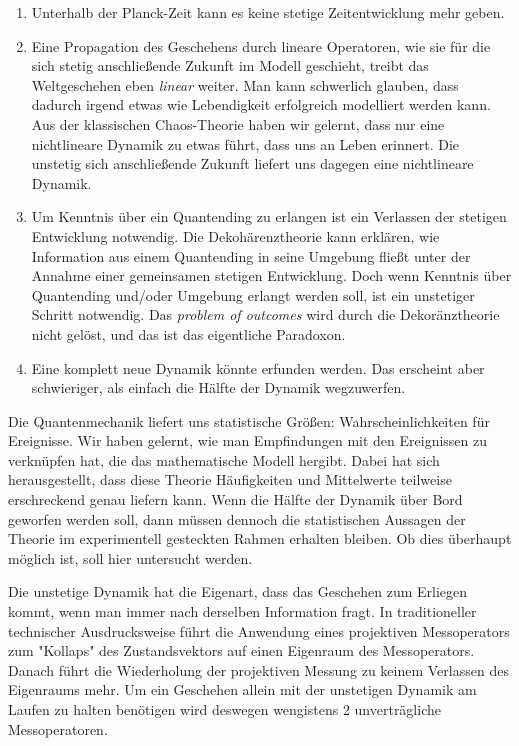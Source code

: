 \documentclass[12pt]{article}
\begin{document}
\begin{enumerate}
    \item Unterhalb der Planck-Zeit kann es keine stetige Zeitentwicklung mehr geben.
    \item Eine Propagation des Geschehens durch lineare Operatoren, wie sie für die sich stetig anschließende Zukunft im Modell geschieht, treibt das Weltgeschehen eben \emph{linear} weiter. Man kann schwerlich glauben, dass dadurch irgend etwas wie Lebendigkeit erfolgreich modelliert werden kann. Aus der klassischen Chaos-Theorie haben wir gelernt, dass nur eine nichtlineare Dynamik zu etwas führt, dass uns an Leben erinnert. Die unstetig sich anschließende Zukunft liefert uns dagegen eine nichtlineare Dynamik.
    \item Um Kenntnis über ein Quantending zu erlangen ist ein Verlassen der stetigen Entwicklung notwendig. Die Dekohärenztheorie kann erklären, wie Information aus einem Quantending in seine Umgebung fließt unter der Annahme einer gemeinsamen stetigen Entwicklung. Doch wenn Kenntnis über Quantending und/oder Umgebung erlangt werden soll, ist ein unstetiger Schritt notwendig. Das \emph{problem of outcomes} wird durch die Dekoränztheorie nicht gelöst, und das ist das eigentliche Paradoxon.
    \item Eine komplett neue Dynamik könnte erfunden werden. Das erscheint aber schwieriger, als einfach die Hälfte der Dynamik wegzuwerfen.
\end{enumerate}
Die Quantenmechanik liefert uns statistische Größen: Wahrscheinlichkeiten für Ereignisse. Wir haben gelernt, wie man Empfindungen mit den Ereignissen zu verknüpfen hat, die das mathematische Modell hergibt. Dabei hat sich herausgestellt, dass diese Theorie Häufigkeiten und Mittelwerte teilweise erschreckend genau liefern kann. Wenn die Hälfte der Dynamik über Bord geworfen werden soll, dann müssen dennoch die statistischen Aussagen der Theorie im experimentell gesteckten Rahmen erhalten bleiben. Ob dies überhaupt möglich ist, soll hier untersucht werden. 

Die unstetige Dynamik hat die Eigenart, dass das Geschehen zum Erliegen kommt, wenn man immer nach derselben Information fragt. In traditioneller technischer Ausdrucksweise führt die Anwendung eines projektiven Messoperators zum "Kollaps" des Zustandsvektors auf einen Eigenraum des Messoperators. Danach führt die Wiederholung der projektiven Messung zu keinem Verlassen des Eigenraums mehr. Um ein Geschehen allein mit der unstetigen Dynamik am Laufen zu halten benötigen wird deswegen wengistens 2 unverträgliche Messoperatoren.
\end{document}

